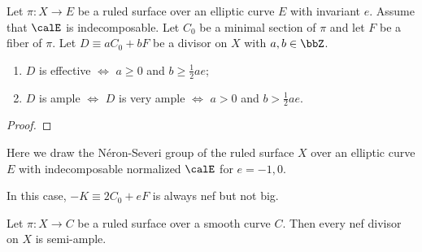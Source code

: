     \begin{theorem}\label{thm:positivity_of_divisors_on_indecomposable_ruled_surface_over_elliptic_curve}
        Let \(\pi:X \to E\) be a ruled surface over an elliptic curve \(E\) with invariant \(e\).
        Assume that \(\calE\) is indecomposable.
        Let \(C_0\) be a minimal section of \(\pi\) and let \(F\) be a fiber of \(\pi\). 
        Let \(D \equiv aC_0 + bF\) be a divisor on \(X\) with \(a,b \in \bbZ\).
        \begin{enumerate}
            \item \(D\) is effective \(\iff\) \(a \geq 0\) and \(b \geq \frac{1}{2}ae\);
            \item \(D\) is ample \(\iff\) \(D\) is very ample \(\iff\) \(a > 0\) and \(b > \frac{1}{2}ae\).
        \end{enumerate}
    \end{theorem}
    \begin{proof}
    \end{proof}

    \begin{example}\label{eg:Neron_Severi_group_of_indecomposable_ruled_surface_over_elliptic_curve}
        Here we draw the N\'eron-Severi group of the ruled surface \(X\) over an elliptic curve \(E\) with indecomposable normalized \(\calE\) for \(e = -1,0\).
        \begin{center}
        \end{center}
        In this case, \(-K\equiv 2C_0 + eF\) is always nef but not big.
    \end{example}


    \begin{proposition}\label{prop:nef_is_bpf_on_ruled_surface}
        Let \(\pi:X \to C\) be a ruled surface over a smooth curve \(C\).
        Then every nef divisor on \(X\) is semi-ample.
    \end{proposition}

